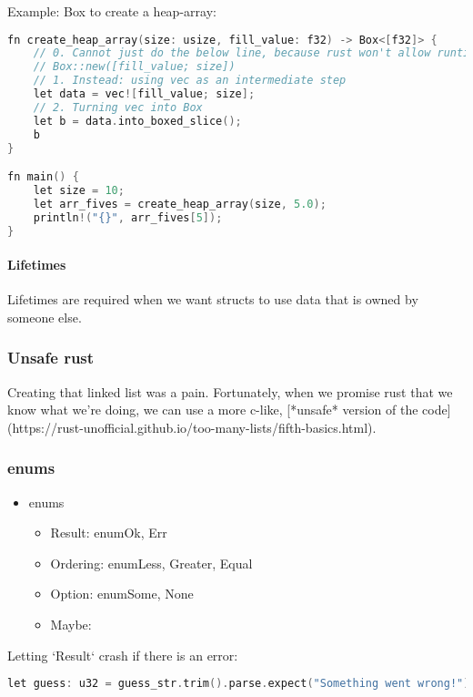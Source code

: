 Example: Box to create a heap-array:
\begin{lstlisting}[language=c]
fn create_heap_array(size: usize, fill_value: f32) -> Box<[f32]> {
    // 0. Cannot just do the below line, because rust won't allow runtime-sized arrays [fill_val; size]
    // Box::new([fill_value; size]) 
    // 1. Instead: using vec as an intermediate step
    let data = vec![fill_value; size];  
    // 2. Turning vec into Box
    let b = data.into_boxed_slice();  
    b
}

fn main() {
    let size = 10;
    let arr_fives = create_heap_array(size, 5.0);
    println!("{}", arr_fives[5]);
}
\end{lstlisting}

\paragraph{Lifetimes}
Lifetimes are required when we want structs to use data that is owned by someone else.


\subsubsection{Unsafe rust}
Creating that linked list was a pain. Fortunately, when we promise rust that we know what we're doing, we can use a more c-like, [*unsafe* version of the code](https://rust-unofficial.github.io/too-many-lists/fifth-basics.html).

\subsubsection{enums}
\begin{itemize}
    \item enums
    \begin{itemize}
        \item Result: enum{Ok, Err}
        \item Ordering: enum{Less, Greater, Equal}
        \item Option: enum{Some, None}
        \item Maybe:
    \end{itemize}
\end{itemize}

Letting `Result` crash if there is an error:
\begin{lstlisting}[language=c]
let guess: u32 = guess_str.trim().parse.expect("Something went wrong!");
\end{lstlisting}

